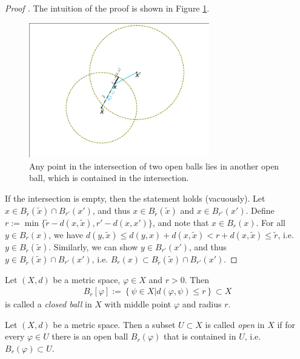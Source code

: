 \begin{proof}[Proof \cite{886810}]
	The intuition of the proof is shown in Figure \ref{fig:open_balls_intersection}.
	\begin{figure}[h!]
		\centering
		\includegraphics[trim={2.5cm 0.9cm 1.7cm 0.14cm}, clip, width=0.7\textwidth]{Figures/circles_modified.pdf}
		\caption{Any point in the intersection of two open balls lies in another open ball, which is contained in the intersection.}
		\label{fig:open_balls_intersection}
	\end{figure}
	If the intersection is empty, then the statement holds (vacuously). Let $x\in B_{\tilde{r}}(\tilde{x}) \cap B_{r'}(x')$, and thus $x\in B_{\tilde{r}}(\tilde{x})$ and $x\in B_{r'}(x')$. Define $r := \min\{ \tilde{r} - d(x, \tilde{x}), r' - d(x, x') \}$, and note that $x\in B_{r}(x)$. For all $y\in B_{r}(x)$, we have $d(y, \tilde{x}) \leq d(y, x) + d(x, \tilde{x}) < r + d(x, \tilde{x}) \leq \tilde{r}$, i.e. $y\in B_{\tilde{r}}(\tilde{x})$. Similarly, we can show $y\in B_{r'}(x')$, and thus $y\in B_{\tilde{r}}(\tilde{x})\cap B_{r'}(x')$, i.e. $B_{r}(x)\subset B_{\tilde{r}}(\tilde{x})\cap B_{r'}(x')$.
\end{proof}

\begin{defn}
	Let $(X, d)$ be a metric space, $\varphi\in X$ and $r > 0$. Then 
	\begin{align}
		B_{r}[\varphi] := \left\{ \psi\in X \vert d(\varphi, \psi) \leq r\right\} \subset X
	\end{align}
	is called a \textit{closed ball} in $X$ with middle point $\varphi$ and radius $r$.
\end{defn}

\begin{defn}
	\label{defn-open-set}
	Let $(X, d)$ be a metric space. Then a subset $U\subset X$ is called \textit{open} in $X$ if for every $\varphi \in U$ there is an open ball $B_{r}(\varphi)$ that is contained in $U$, i.e. $B_r(\varphi)\subset U$. 
\end{defn}

